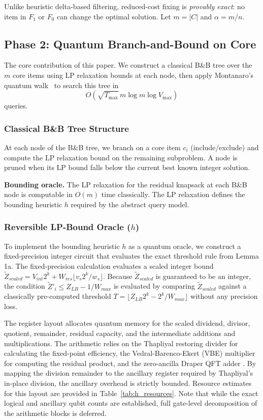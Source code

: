 \documentclass[conference]{IEEEtran}
\begin{document}
Unlike heuristic delta-based filtering, reduced-cost fixing is \textit{provably exact}: no item in $F_1$ or $F_0$ can change the optimal solution. Let $m = |C|$ and $\alpha = m/n$.

\subsection{Phase 2: Quantum Branch-and-Bound on Core}

The core contribution of this paper. We construct a classical B\&B tree over the $m$ core items using LP relaxation bounds at each node, then apply Montanaro's quantum walk~\cite{ref24} to search this tree in $$O\!\left(\sqrt{T_{\max}}\,m\log m\log V_{\max}\right)$$ queries.

\subsubsection{Classical B\&B Tree Structure}

At each node of the B\&B tree, we branch on a core item $c_i$ (include/exclude) and compute the LP relaxation bound on the remaining subproblem. A node is pruned when its LP bound falls below the current best known integer solution.

\textbf{Bounding oracle.} The LP relaxation for the residual knapsack at each B\&B node is computable in $O(m)$ time classically. The LP relaxation defines the bounding heuristic $h$ required by the abstract query model.

\subsubsection{Reversible LP-Bound Oracle ($h$)}

To implement the bounding heuristic $h$ as a quantum oracle, we construct a fixed-precision integer circuit that evaluates the exact threshold rule from Lemma 1a. The fixed-precision calculation evaluates a scaled integer bound $\tilde{Z}_{scaled} = V_{int} 2^k + W_{res} \lfloor v_s 2^k / w_s \rfloor$. Because $\tilde{Z}_{scaled}$ is guaranteed to be an integer, the condition $\tilde{Z}'_i \le Z_{LB} - 1/W_{max}$ is evaluated by comparing $\tilde{Z}_{scaled}$ against a classically pre-computed threshold $T = \lfloor Z_{LB} 2^k - 2^k/W_{max} \rfloor$ without any precision loss.

The register layout allocates quantum memory for the scaled dividend, divisor, quotient, remainder, residual capacity, and the intermediate additions and multiplications. The arithmetic relies on the Thapliyal restoring divider \cite{thapliyal2016} for calculating the fixed-point efficiency, the Vedral-Barenco-Ekert (VBE) multiplier \cite{vedral1996} for computing the residual product, and the zero-ancilla Draper QFT adder \cite{draper2000}. By mapping the division remainder to the ancillary register required by Thapliyal's in-place division, the ancillary overhead is strictly bounded. Resource estimates for this layout are provided in Table~\ref{tab:h_resources}. Note that while the exact logical and ancillary qubit counts are established, full gate-level decomposition of the arithmetic blocks is deferred.
\end{document}
